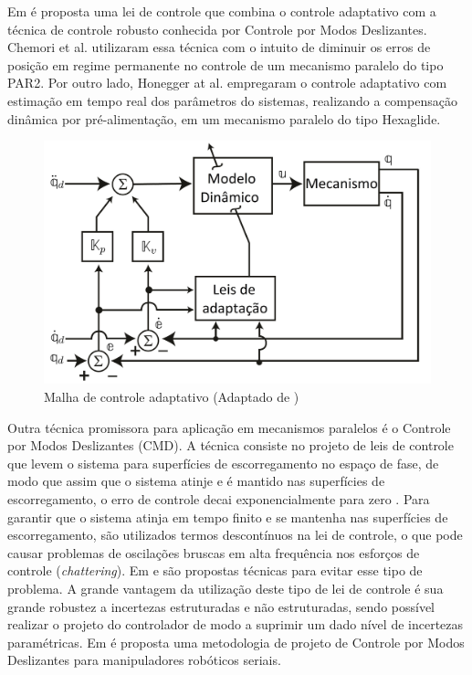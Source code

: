\documentclass[]{politex}
\begin{document}
Em \cite{SlotiniA} é proposta uma lei de controle que combina o controle adaptativo com a técnica de controle robusto conhecida por Controle por Modos Deslizantes. Chemori et al. \cite{Chemori} utilizaram essa técnica  com o intuito de diminuir os erros de posição em regime permanente no controle de um mecanismo paralelo do tipo PAR2. Por outro lado, Honegger at al. \cite{Honegger} empregaram o controle adaptativo com estimação em tempo real dos parâmetros do sistemas, realizando a compensação dinâmica por pré-alimentação, em um mecanismo  paralelo do tipo Hexaglide.

\begin{figure}[h]
	\centering
	\includegraphics[scale=0.385]{../figures/CA.jpg}  
	\caption{Malha de controle adaptativo (Adaptado de \cite{Craig})}
	\label{fig:CTCp}
\end{figure}

Outra técnica promissora para aplicação em mecanismos paralelos é o Controle por Modos Deslizantes (CMD). A técnica consiste no projeto de leis de controle que levem o sistema para superfícies de escorregamento no espaço de fase, de modo que assim que o sistema atinje e é mantido nas superfícies de escorregamento, o erro de controle decai exponencialmente para zero \cite{Slotini}. Para garantir que o sistema atinja em tempo finito e se mantenha nas superfícies de escorregamento, são utilizados termos descontínuos na lei de controle, o que pode causar problemas de oscilações bruscas em alta frequência nos esforços de controle ({\em chattering}). Em \cite{Guldner}  e  \cite{Utkin2} são propostas técnicas para evitar esse tipo de problema. A grande vantagem da utilização deste tipo de lei de controle é sua grande robustez a incertezas estruturadas e não estruturadas, sendo possível realizar o projeto do controlador de modo a suprimir um dado nível de incertezas paramétricas. Em \cite{SlotiniSMC} é proposta uma metodologia de projeto de Controle por Modos Deslizantes para manipuladores robóticos seriais.
\end{document}
